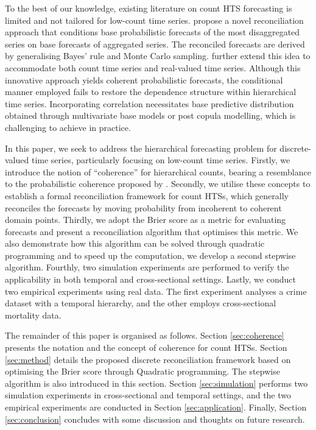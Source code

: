 \documentclass[a4paper,review,12pt,authoryear]{elsarticle}
\begin{document}
To the best of our knowledge, existing literature on count HTS forecasting is limited and not tailored for low-count time series.
\cite{coraniProbabilisticReconciliationCount2022} propose a novel reconciliation approach that conditions base probabilistic forecasts of the most disaggregated series on base forecasts of aggregated series. 
The reconciled forecasts are derived by generalising Bayes’ rule and Monte Carlo sampling.
\cite{zambonEfficientProbabilisticReconciliation2022} further extend this idea to accommodate both count time series and real-valued time series.
Although this innovative approach yields coherent probabilistic forecasts, 
the conditional manner employed fails to restore the dependence structure within hierarchical time series.
Incorporating correlation necessitates base predictive distribution obtained through multivariate base models or post copula modelling, which is challenging to achieve in practice.

In this paper, we seek to address the hierarchical forecasting problem for discrete-valued time series, particularly focusing on low-count time series.
Firstly, we introduce the notion of ``coherence'' for hierarchical counts, 
bearing a resemblance to the probabilistic coherence proposed by \cite{panagiotelisProbabilisticForecastReconciliation2022}.
Secondly, we utilise these concepts to establish a formal reconciliation framework for count HTSs, which generally reconciles the forecasts by moving probability from incoherent to coherent domain points.
Thirdly, we adopt the Brier score as a metric for evaluating forecasts and present a reconciliation algorithm that optimises this metric. 
We also demonstrate how this algorithm can be solved through quadratic programming and to speed up the computation, we develop a second stepwise algorithm. 
Fourthly, two simulation experiments are performed to verify the applicability  in both temporal and cross-sectional settings. 
Lastly, we conduct two empirical experiments using real data. The first experiment analyses a crime dataset with a temporal hierarchy, and the other employs cross-sectional mortality data.

The remainder of this paper is organised as follows. 
Section \ref{sec:coherence} presents the notation and the concept of coherence for count HTSs.
Section \ref{sec:method} details the proposed discrete reconciliation framework based on optimising the Brier score through Quadratic programming. The stepwise algorithm is also introduced in this section. 
Section \ref{sec:simulation} performs two simulation experiments in cross-sectional and temporal settings, and the two empirical experiments are conducted in Section \ref{sec:application}. 
Finally, Section \ref{sec:conclusion} concludes with some discussion and thoughts on future research.
\end{document}
